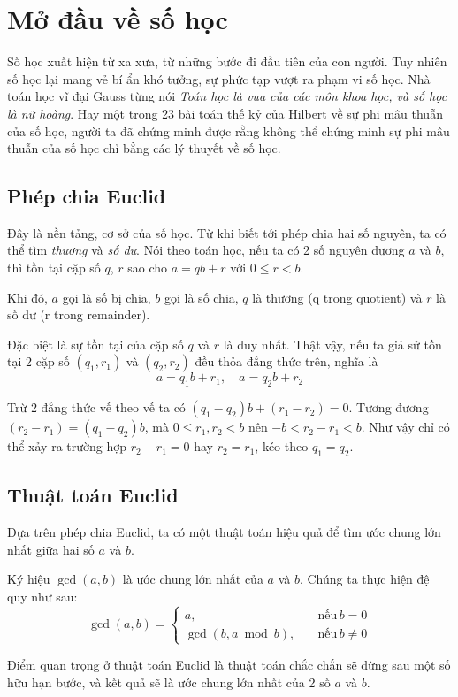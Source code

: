 \chapter{Mở đầu về số học}

Số học xuất hiện từ xa xưa, từ những bước đi đầu tiên của con
người. Tuy nhiên số học lại mang vẻ bí ẩn khó tưởng, sự phức
tạp vượt ra phạm vi số học. Nhà toán học vĩ đại Gauss từng nói
\textit{Toán học là vua của các môn khoa học, và số học là
nữ hoàng}. Hay một trong 23 bài toán thế kỷ của Hilbert về sự
phi mâu thuẫn của số học, người ta đã chứng minh được rằng
không thể chứng minh sự phi mâu thuẫn của số học chỉ bằng các
lý thuyết về số học.

\section{Phép chia Euclid}

Đây là nền tảng, cơ sở của số học. Từ khi biết tới phép chia
hai số nguyên, ta có thể tìm \textit{thương} và \textit{số dư}.
Nói theo toán học, nếu ta có 2 số nguyên dương $a$ và $b$, thì
tồn tại cặp số $q$, $r$ sao cho $a = qb + r$ với $0 \leq r < b$.

Khi đó, $a$ gọi là số bị chia, $b$ gọi là số chia, $q$ là thương
(q trong quotient) và $r$ là số dư (r trong remainder).

Đặc biệt là sự tồn tại của cặp số $q$ và $r$ là duy nhất. Thật
vậy, nếu ta giả sử tồn tại 2 cặp số $(q_1, r_1)$ và $(q_2, r_2)$ 
đều thỏa đẳng thức trên, nghĩa là
\[a = q_1 b + r_1, \quad a = q_2 b + r_2\]

Trừ 2 đẳng thức vế theo vế ta có $(q_1 - q_2) b + (r_1 - r_2) = 0$.
Tương đương $(r_2 - r_1) = (q_1 - q_2) b$, mà $0 \leq r_1, r_2 < b$
nên $-b < r_2 - r_1 < b$. Như vậy chỉ có thể xảy ra trường hợp
$r_2 - r_1 = 0$ hay $r_2 = r_1$, kéo theo $q_1 = q_2$.

\section{Thuật toán Euclid}

Dựa trên phép chia Euclid, ta có một thuật toán hiệu quả để tìm
ước chung lớn nhất giữa hai số $a$ và $b$.

Ký hiệu $\gcd(a, b)$ là ước chung lớn nhất của $a$ và $b$. Chúng 
ta thực hiện đệ quy như sau:
\[\gcd(a, b) = \begin{cases}
    a, \quad & \text{nếu}\,b = 0 \\
    \gcd(b, a \bmod b), \quad & \text{nếu}\,b \neq 0
\end{cases} 
    \]

Điểm quan trọng ở thuật toán Euclid là thuật toán chắc chắn sẽ dừng
sau một số hữu hạn bước, và kết quả sẽ là ước chung lớn nhất của 2
số $a$ và $b$.